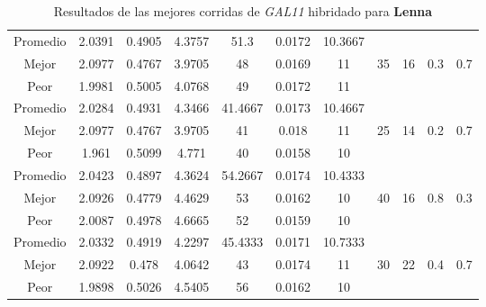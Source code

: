 \begin{table}[h!]
\begin{center}
\begin{tabular}{|c|c|c|c|c|c|c|c|c|c|c|}
        \hline
        \hline
            Promedio  & 2.0391 & 0.4905 & 4.3757 & 51.3 & 0.0172 & 10.3667 &  &  &  & \\
            \cline{1-7}
            Mejor & 2.0977 & 0.4767  & 3.9705 & 48 & 0.0169 & 11 & 35 & 16 & 0.3 & 0.7\\
            \cline{1-7}
            Peor & 1.9981 & 0.5005  & 4.0768 & 49 & 0.0172 & 11 &  &  &  & \\
        \hline
        \hline
            Promedio  & 2.0284 & 0.4931 & 4.3466 & 41.4667 & 0.0173 & 10.4667 &  &  &  & \\
            \cline{1-7}
            Mejor & 2.0977 & 0.4767  & 3.9705 & 41 & 0.018 & 11 & 25 & 14 & 0.2 & 0.7\\
            \cline{1-7}
            Peor & 1.961 & 0.5099  & 4.771 & 40 & 0.0158 & 10 &  &  &  & \\
        \hline
        \hline
            Promedio  & 2.0423 & 0.4897 & 4.3624 & 54.2667 & 0.0174 & 10.4333 &  &  &  & \\
            \cline{1-7}
            Mejor & 2.0926 & 0.4779  & 4.4629 & 53 & 0.0162 & 10 & 40 & 16 & 0.8 & 0.3\\
            \cline{1-7}
            Peor & 2.0087 & 0.4978  & 4.6665 & 52 & 0.0159 & 10 &  &  &  & \\
        \hline
        \hline
            Promedio  & 2.0332 & 0.4919 & 4.2297 & 45.4333 & 0.0171 & 10.7333 &  &  &  & \\
            \cline{1-7}
            Mejor & 2.0922 & 0.478  & 4.0642 & 43 & 0.0174 & 11 & 30 & 22 & 0.4 & 0.7\\
            \cline{1-7}
            Peor & 1.9898 & 0.5026  & 4.5405 & 56 & 0.0162 & 10 &  &  &  & \\
        \hline
        \end{tabular}
        \caption{Resultados de las mejores corridas de \emph{GAL11} hibridado para {\bf Lenna}}
        \label{tb:tableGAL11}
    \end{center}
\end{table}
